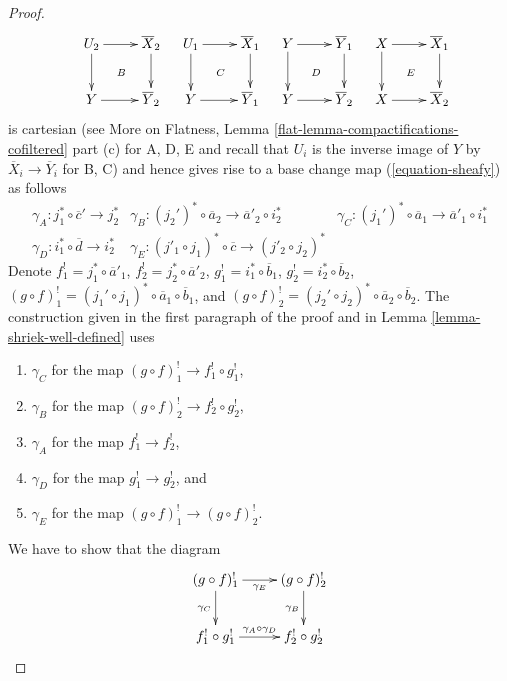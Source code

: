 \documentclass{stacks-project}
\theoremstyle{plain}
\theoremstyle{definition}
\theoremstyle{remark}
\numberwithin{equation}{subsection}
\begin{document}
\begin{proof}
$${}
\quad
\xymatrix{
U_2 \ar[r] \ar[d] \ar@{}[dr]|B & \overline{X}_2 \ar[d] \\
Y \ar[r] & \overline{Y}_2
}
\quad
\xymatrix{
U_1 \ar[r] \ar[d] \ar@{}[dr]|C & \overline{X}_1 \ar[d] \\
Y \ar[r] & \overline{Y}_1
}
\quad
\xymatrix{
Y \ar[r] \ar[d] \ar@{}[dr]|D & \overline{Y}_1 \ar[d] \\
Y \ar[r] & \overline{Y}_2
}
\quad
\xymatrix{
X \ar[r] \ar[d] \ar@{}[dr]|E & \overline{X}_1 \ar[d] \\
X \ar[r] & \overline{X}_2
}
$$
is cartesian (see
More on Flatness, Lemma \ref{flat-lemma-compactifications-cofiltered} part (c)
for A, D, E and recall that $U_i$ is the inverse image of $Y$
by $\overline{X}_i \to \overline{Y}_i$ for B, C) and hence
gives rise to a base change map (\ref{equation-sheafy}) as follows
$$
\begin{matrix}
\gamma_A : j_1^* \circ \overline{c}' \to j_2^* &
\gamma_B : (j_2')^* \circ \overline{a}_2 \to \overline{a}'_2 \circ i_2^* &
\gamma_C : (j_1')^* \circ \overline{a}_1 \to \overline{a}'_1 \circ i_1^* \\
\gamma_D : i_1^* \circ \overline{d} \to i_2^* &
\gamma_E : (j'_1 \circ j_1)^* \circ \overline{c} \to (j'_2 \circ j_2)^*
\end{matrix}
$$
Denote $f_1^! = j_1^* \circ \overline{a}'_1$,
$f_2^! = j_2^* \circ \overline{a}'_2$,
$g_1^! = i_1^* \circ \overline{b}_1$,
$g_2^! = i_2^* \circ \overline{b}_2$,
$(g \circ f)_1^! =
(j_1' \circ j_1)^* \circ \overline{a}_1 \circ \overline{b}_1$, and
$(g \circ f)^!_2 =
(j_2' \circ j_2)^* \circ \overline{a}_2 \circ \overline{b}_2$.
The construction given in the first paragraph of the proof
and in Lemma \ref{lemma-shriek-well-defined} uses
\begin{enumerate}
\item $\gamma_C$ for the map $(g \circ f)^!_1 \to f_1^! \circ g_1^!$,
\item $\gamma_B$ for the map $(g \circ f)^!_2 \to f_2^! \circ g_2^!$,
\item $\gamma_A$ for the map $f_1^! \to f_2^!$,
\item $\gamma_D$ for the map $g_1^! \to g_2^!$, and
\item $\gamma_E$ for the map $(g \circ f)^!_1 \to (g \circ f)^!_2$.
\end{enumerate}
We have to show that the diagram
$$
\xymatrix{
(g \circ f)^!_1 \ar[r]_{\gamma_E} \ar[d]_{\gamma_C} &
(g \circ f)^!_2 \ar[d]_{\gamma_B} \\
f_1^! \circ g_1^! \ar[r]^{\gamma_A \circ \gamma_D} & f_2^! \circ g_2^!
}$$
\end{proof}
\end{document}
